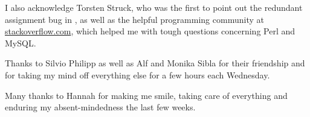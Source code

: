I also acknowledge Torsten Struck, who was the first to point out the redundant
assignment bug in \hamstr, as well as the helpful programming community at
\url{stackoverflow.com}, which helped me with tough questions concerning Perl
and MySQL.

Thanks to Silvio Philipp as well as Alf and Monika Sibla for their friendship
and for taking my mind off everything else for a few hours each Wednesday. 

Many thanks to Hannah for making me smile, taking care of everything and
enduring my absent-mindedness the last few weeks. 
